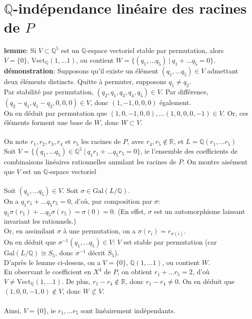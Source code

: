 \documentclass[a4paper, 12pt]{article}
\begin{document}
	
	\section{$\mathbb Q$-indépendance linéaire des racines de $P$}
	\textbf{lemme}: Si $V \subset \mathbb Q^5$ est un $\mathbb Q$-espace vectoriel stable par permutation, alors $V = \{0\}$, $\mathrm{Vect}_\mathbb Q (1, \dots 1)$, ou contient $W = \{(q_1, \dots q_5) \ |\ q_1 + \dots q_5 = 0\}$. \\
	\textbf{démonstration}: Supposons qu'il existe un élément  $(q_1, \dots q_5) \in V$ admettant deux éléments distincts. Quitte à permuter, supposons $q_1 \not = q_2$. \\
	Par stabilité par permutation, $(q_2, q_1, q_3, q_4, q_5) \in V$. Par différence, $(q_2 - q_1, q_1 - q_2, 0, 0, 0) \in V$, donc $(1, -1, 0, 0, 0)$ également.\\ On en déduit par permutation que $(1, 0, -1, 0, 0), \dots (1, 0, 0, 0, -1) \in V$. Or, ces éléments forment une base de $W$, donc $W \subset V$.
	\\ \\
	
	On note $r_1, r_2, r_3, r_4 \text{ et } r_5$ les racines de $P$, avec $r_4, r_5 \not \in \mathbb R$, et $L = \mathbb Q (r_1, \dots r_5)$ \\
	Soit $V = \{(q_1, \dots q_5) \in \mathbb Q^5\ |\ q_1 r_1 + \dots q_5 r_5 = 0\}$, ie l'ensemble des coefficients de combinaisons linéaires rationnelles annulant les racines de $P$. On montre aisément que $V$ est un $\mathbb Q$-espace vectoriel
	\\ \\
	
	Soit $(q_1, \dots q_5) \in V$. Soit $\sigma \in \mathrm{Gal} (L/\mathbb Q)$. \\
	On a $q_1 r_1 + \dots q_5 r_5 = 0$, d'où, par composition par $\sigma$: $q_1 \sigma (r_1) + \dots q_5 \sigma(r_5) = \sigma(0) = 0$. (En effet, $\sigma$ est un automorphisme laissant invariant les rationnels.) \\
	Or, en assimilant $\sigma$ à une permutation, on a $\sigma(r_i) = r_{\sigma(i)}$.\\ On en déduit que $\sigma^{-1}(q_1, \dots q_5) \in V$: $V$ est stable par permutation (car $\mathrm{Gal} (L/\mathbb Q) \cong S_5$, donc $\sigma^{-1}$ décrit $S_5$). \\
	
	D'après le lemme ci-dessus, on a $V = \{0\}$, $\mathbb Q (1, \dots 1)$, ou contient $W$.\\
	En observant le coefficient en $X^4$ de $P$, on obtient $r_1 + \dots r_5 = 2$, d'où $V \not = \mathrm{Vect}_\mathbb Q (1, \dots 1)$. De plus, $r_1-r_4 \not \in \mathbb R$, donc $r_1 - r_4 \not = 0$. On en déduit que $(1, 0, 0, -1, 0) \not \in V$, donc $W \not \subset V$.
	\\ \\
	Ainsi, $V = \{0\}$, ie $r_1, \dots r_5$ sont linéairement indépendants.
	
\end{document}
